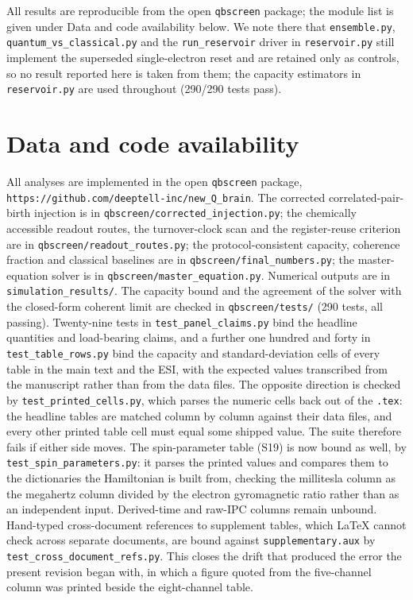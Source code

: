 \documentclass[aps,prx,reprint,superscriptaddress,nofootinbib,floatfix]{revtex4-2}
\begin{document}
All results are reproducible from the open \texttt{qbscreen} package; the module
list is given under Data and code availability below. We note there that
\texttt{ensemble.py}, \texttt{quantum\_vs\_classical.py} and the
\texttt{run\_reservoir} driver in \texttt{reservoir.py} still implement the
superseded single-electron reset and are retained only as controls, so no result
reported here is taken from them; the capacity estimators in
\texttt{reservoir.py} are used throughout (290/290 tests pass).


\section{Data and code availability}
All analyses are implemented in the open \texttt{qbscreen} package,
\texttt{https://github.com/deeptell-inc/new\_Q\_brain}. The corrected
correlated-pair-birth injection is in \texttt{qbscreen/corrected\_injection.py}; the
chemically accessible readout routes, the turnover-clock scan and the
register-reuse criterion are in \texttt{qbscreen/readout\_routes.py}; the
protocol-consistent capacity, coherence fraction and classical baselines are in
\texttt{qbscreen/final\_numbers.py}; the master-equation solver is in
\texttt{qbscreen/master\_equation.py}. Numerical outputs are in
\texttt{simulation\_results/}. The capacity bound and the agreement of the solver
with the closed-form coherent limit are checked in \texttt{qbscreen/tests/}
(290 tests, all passing). Twenty-nine tests in \texttt{test\_panel\_claims.py} bind
the headline quantities and load-bearing claims, and a further one hundred and forty in
\texttt{test\_table\_rows.py} bind the capacity and standard-deviation cells of
every table in the main text and the ESI, with the expected values
transcribed from the manuscript rather than from the data files. The opposite
direction is checked by \texttt{test\_printed\_cells.py}, which parses the numeric
cells back out of the \texttt{.tex}: the headline tables are matched column by
column against their data files, and every other printed table cell must equal
some shipped value. The suite therefore fails if either side moves. The spin-parameter table (S19) is now bound as well, by
\texttt{test\_spin\_parameters.py}: it parses the printed values and compares them
to the dictionaries the Hamiltonian is built from, checking the millitesla column
as the megahertz column divided by the electron gyromagnetic ratio rather than as
an independent input. Derived-time and raw-IPC columns remain unbound. Hand-typed
cross-document references to supplement tables, which \LaTeX{} cannot check
across separate documents, are bound against \texttt{supplementary.aux} by
\texttt{test\_cross\_document\_refs.py}. This closes the drift that
produced the error the present revision began with, in which a figure quoted from
the five-channel column was printed beside the eight-channel table.  
           
\end{document}
